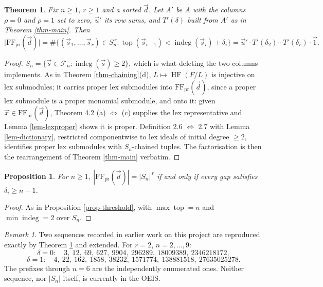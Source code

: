 \documentclass[11pt, a4paper, abstract=yes]{scrartcl}
\theoremstyle{definition}
\theoremstyle{remark}
\newtheorem{remark}[definition]{Remark}
\theoremstyle{plain}
\newtheorem{proposition}[definition]{Proposition}
\newtheorem{theorem}[definition]{Theorem}
\newcommand{\indeg}{\operatorname{indeg}}
\newcommand{\tp}{\operatorname{top}}
\newcommand{\HF}{\operatorname{HF}}
\begin{document}
\begin{theorem}
Fix \(n\ge1\), \(r\ge1\) and a sorted \(\vec d\). Let \(A'\) be \(A\) with the columns \(\rho=0\) and
\(\rho=1\) set to zero, \(\vec u'\) its row sums, and \(T'(\delta)\) built from \(A'\) as in
Theorem \ref{thm-main}. Then
\begin{equation}\label{eq:auto-16}
  \lvert\mathrm{FF}_{\mathrm{pr}}(\vec d)\rvert
  =\#\bigl\lbrace(\vec s_1,\dots,\vec s_r)\in S_n^{\,r}:\tp(\vec s_{i-1})<\indeg(\vec s_i)+\delta_i\bigr\rbrace
  = \vec u'\cdot T'(\delta_2)\cdots T'(\delta_r)\cdot\vec 1 .
\end{equation}
\label{thm-proper}
\end{theorem}

\begin{proof}
\(S_n=\lbrace \vec s\in\mathcal F_n:\indeg(\vec s)\ge2\rbrace\), which is what deleting the two columns
implements. As in Theorem \ref{thm-chaining}(d), \(L\mapsto\HF(F/L)\) is injective on lex submodules; it
carries proper lex submodules into \(\mathrm{FF}_{\mathrm{pr}}(\vec d)\), since a proper lex submodule is a
proper monomial submodule, and onto it: given \(\vec x\in\mathrm{FF}_{\mathrm{pr}}(\vec d)\), Theorem 4.2
(a) \(\Leftrightarrow\) (c) supplies the lex representative and Lemma \ref{lem-lexproper} shows it is
proper. Definition 2.6 \(\Leftrightarrow\) 2.7 with Lemma \ref{lem-dictionary}, restricted componentwise
to lex ideals of initial degree \(\ge2\), identifies proper lex submodules with \(S_n\)-chained
tuples. The factorisation is then the rearrangement of Theorem \ref{thm-main} verbatim.
\end{proof}

\begin{proposition}
For \(n\ge1\), \(|\mathrm{FF}_{\mathrm{pr}}(\vec d)|=|S_n|^{\,r}\) if and only if every gap satisfies
\(\delta_i\ge n-1\).
\label{prop-proper-threshold}
\end{proposition}

\begin{proof}
As in Proposition \ref{prop-threshold}, with \(\max\tp=n\) and \(\min\indeg=2\) over \(S_n\).
\end{proof}

\begin{remark}
Two sequences recorded in earlier work on this project are reproduced exactly by
Theorem \ref{thm-proper} and extended. For \(r=2\), \(n=2,\dots,9\):
\begin{equation}\label{eq:auto-17}
  \delta=0:\quad 3,\ 12,\ 69,\ 627,\ 9904,\ 296289,\ 18009389,\ 2346218172,
\end{equation}
\begin{equation}\label{eq:auto-18}
  \delta=1:\quad 4,\ 22,\ 162,\ 1858,\ 38232,\ 1571774,\ 138881518,\ 27635025278 .
\end{equation}
The prefixes through \(n=6\) are the independently enumerated ones. Neither sequence, nor \(|S_n|\)
itself, is currently in the OEIS.
\label{rem-proper-sequences}
\end{remark}
\end{document}
